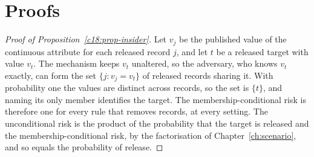 \section{Proofs}

\begin{proof}[Proof of Proposition~\ref{c18:prop-insider}]
Let $v_j$ be the published value of the continuous attribute for each released record
$j$, and let $t$ be a released target with value $v_t$. The mechanism keeps $v_t$
unaltered, so the adversary, who knows $v_t$ exactly, can form the set
$\{j : v_j = v_t\}$ of released records sharing it. With probability one the values
are distinct across records, so the set is $\{t\}$, and naming its only member
identifies the target. The membership-conditional risk is therefore one for every rule
that removes records, at every setting. The unconditional risk is the product of the
probability that the target is released and the membership-conditional risk, by the
factorisation of Chapter~\ref{ch:scenario}, and so equals the probability of release.
\end{proof}
